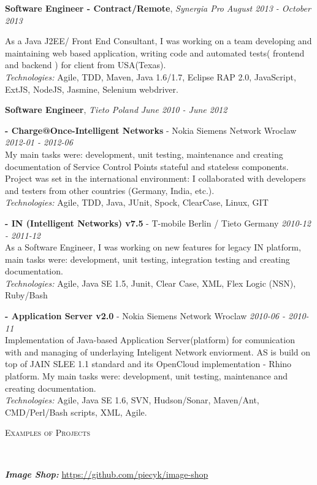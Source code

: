 \documentclass[9pt]{article}
\newenvironment{changemargin}[2]{%
  \begin{list}{}{%
      \setlength{\topsep}{0pt}%
      \setlength{\leftmargin}{#1}%
      \setlength{\rightmargin}{#2}%
      \setlength{\listparindent}{\parindent}%
      \setlength{\itemindent}{\parindent}%
      \setlength{\parsep}{\parskip}%
    }%
  \item[]}{\end{list}
}
\newcommand{\lineover}{
  \begin{changemargin}{-0.05in}{-0.05in}
    \vspace*{-8pt}
    \hrulefill \\
    \vspace*{-2pt}
  \end{changemargin}
}
\newcommand{\header}[1]{
	\begin{changemargin}{-0.5in}{-0.5in}
		\scshape{#1}\\
  	\lineover
	\end{changemargin}
}
\newcommand{\jobtitle}[3]{
	\textbf{#1}, \emph{#2} \hfill \emph{#3}\\
}
\newcommand{\jobdescription}[1]{
	\begin{changemargin}{0.15in}{0.15in}
    \smallskip
		{#1}
    \medskip
	\end{changemargin}
}
\newenvironment{body} {
	\vspace*{-16pt}
	\begin{changemargin}{-0.25in}{-0.5in}
  }
	{\end{changemargin}
}
\begin{document}
\begin{body}
  \jobtitle{Software Engineer - Contract/Remote}{Synergia Pro}{August 2013 - October 2013}{}
  \jobdescription{
    As a Java J2EE/ Front End Consultant, I was working on a team developing and maintaining web based application, writing code and automated tests( frontend and backend ) for client from USA(Texas).\\
    \emph{Technologies:} Agile, TDD, Maven, Java 1.6/1.7, Eclipse RAP 2.0, JavaScript, ExtJS, NodeJS, Jasmine, Selenium webdriver.
  }

  \jobtitle{Software Engineer}{Tieto Poland}{June 2010 - June 2012}
  \jobdescription{
    \medskip

    \textbf{- Charge@Once-Intelligent Networks} - Nokia Siemens Network Wroclaw{} \hfill \emph{2012-01 - 2012-06}{} \\
    My main tasks were: development, unit testing, maintenance and creating documentation of Service Control Points stateful and stateless components. Project was set in the international environment: I collaborated with developers and testers from other countries (Germany, India, etc.).\\
    \emph{Technologies:} Agile, TDD, Java, JUnit, Spock, ClearCase, Linux, GIT
    \medskip

    \textbf{- IN (Intelligent Networks) v7.5} - T-mobile Berlin / Tieto Germany{} \hfill \emph{2010-12 - 2011-12}{} \\
    As a Software Engineer, I was working on new features for legacy IN platform, main tasks were: development, unit testing, integration testing and creating documentation.\\
    \emph{Technologies:} Agile, Java SE 1.5, Junit, Clear Case, XML, Flex Logic (NSN), Ruby/Bash
    \medskip

    \textbf{- Application Server v2.0} - Nokia Siemens Network Wroclaw{} \hfill \emph{2010-06 - 2010-11}{} \\
    Implementation of Java-based Application Server(platform) for comunication with and managing of underlaying Inteligent Network enviorment. AS is build on top of JAIN SLEE 1.1 standard and its OpenCloud implementation - Rhino platform. My main tasks were: development, unit testing, maintenance and creating documentation.\\
    \emph{Technologies:} Agile, Java SE 1.6, SVN, Hudson/Sonar, Maven/Ant, CMD/Perl/Bash scripts, XML, Agile.
  }

\end{body}
\medskip


\header{Examples of Projects}
\begin{body}
  \vspace{14pt}
  \emph{\textbf{Image Shop:}}{} \url{https://github.com/piecyk/image-shop}\\
\end{body}
\medskip
\end{document}
